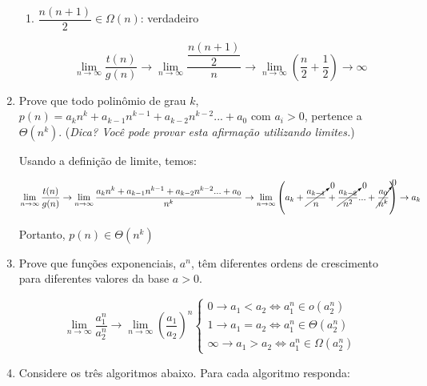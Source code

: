\documentclass[12pt,a4paper]{article}
\begin{document}
\begin{enumerate}
\begin{enumerate}
	
		\item $\dfrac{n(n+1)}{2} \in \Omega(n)$: verdadeiro
		
		\begin{displaymath}
			\lim_{n \rightarrow \infty} \dfrac{t(n)}{g(n)} \rightarrow
			\lim_{n \rightarrow \infty} \dfrac{\dfrac{n(n+1)}{2}}{n} \rightarrow \lim_{n \rightarrow \infty} \left(\dfrac{n}{2} + \dfrac{1}{2}\right) \rightarrow \infty
		\end{displaymath}

	\end{enumerate}

	\item Prove que todo polinômio de grau $k$, $p(n) = a_kn^k + a_{k-1}n^{k-1} + a_{k-2}n^{k-2} ... + a_0$ com $a_i > 0$,
	pertence a $\Theta(n^k)$. (\textit{Dica? Você pode provar esta afirmação utilizando limites.})
	
	Usando a definição de limite, temos:
	
		\begin{displaymath}
		\lim_{n \rightarrow \infty} \dfrac{t(n)}{g(n)} \rightarrow
		\lim_{n \rightarrow \infty} \dfrac{a_kn^k + a_{k-1}n^{k-1} + a_{k-2}n^{k-2} ... + a_0}{n^k} \rightarrow \lim_{n \rightarrow \infty} \left(a_k + \cancelto{0}{\dfrac{a_{k-1}}{n}} + \cancelto{0}{\dfrac{a_{k-2}}{n^2}} ... + \cancelto{0}{\dfrac{a_0}{n^k}}\right) \rightarrow a_k
	\end{displaymath}

	Portanto, $p(n) \in \Theta(n^k)$
	
	\item Prove que funções exponenciais, $a^n$, têm diferentes ordens de crescimento para diferentes valores	da base $a>0$. 
	
	\begin{displaymath}
		\lim_{n \rightarrow \infty} \dfrac{a_{1}^{n}}{a_{2}^{n}} \rightarrow \lim_{n \rightarrow \infty} \left(\dfrac{a_1}{a_2}\right)^n 
		\begin{cases}
			0 \rightarrow a_1 < a_2 \Leftrightarrow a_{1}^{n} \in o(a_{2}^{n})\\
			1 \rightarrow a_1 = a_2 \Leftrightarrow a_{1}^{n} \in \Theta(a_{2}^{n})\\
			\infty \rightarrow a_1 > a_2 \Leftrightarrow a_{1}^{n} \in \Omega(a_{2}^{n})
		\end{cases}
	\end{displaymath}

	\item Considere os três algoritmos abaixo. Para cada algoritmo responda:
	

\end{enumerate}
\end{document}
